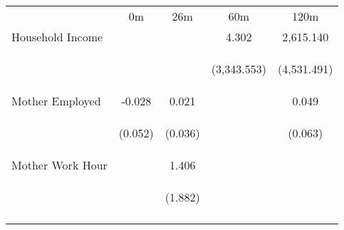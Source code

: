 \begin{tabular}{lcccc}
\hline \noalign{\smallskip} & 0m & 26m & 60m & 120m\\
\noalign{\smallskip}\hline \noalign{\smallskip}Household Income &  &  & 4.302 & 2,615.140\\
 & \begin{footnotesize}\end{footnotesize} & \begin{footnotesize}\end{footnotesize} & \begin{footnotesize}(3,343.553)\end{footnotesize} & \begin{footnotesize}(4,531.491)\end{footnotesize}\\
\noalign{\smallskip}Mother Employed & -0.028 & 0.021 &  & 0.049\\
 & \begin{footnotesize}(0.052)\end{footnotesize} & \begin{footnotesize}(0.036)\end{footnotesize} & \begin{footnotesize}\end{footnotesize} & \begin{footnotesize}(0.063)\end{footnotesize}\\
\noalign{\smallskip}Mother Work Hour &  & 1.406 &  & \\
 & \begin{footnotesize}\end{footnotesize} & \begin{footnotesize}(1.882)\end{footnotesize} & \begin{footnotesize}\end{footnotesize} & \begin{footnotesize}\end{footnotesize}\\
\noalign{\smallskip}\hline\end{tabular}\\
